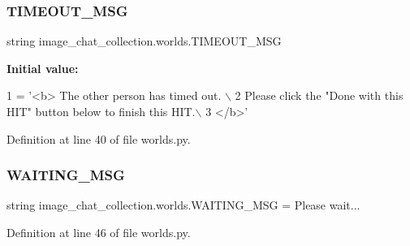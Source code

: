 \subsubsection{\texorpdfstring{T\+I\+M\+E\+O\+U\+T\+\_\+\+M\+SG}{TIMEOUT\_MSG}}
{\footnotesize\ttfamily string image\+\_\+chat\+\_\+collection.\+worlds.\+T\+I\+M\+E\+O\+U\+T\+\_\+\+M\+SG}

{\bfseries Initial value\+:}
\begin{DoxyCode}
1 =  \textcolor{stringliteral}{'<b> The other person has timed out. \(\backslash\)}
2 \textcolor{stringliteral}{        Please click the "Done with this HIT" button below to finish this HIT.\(\backslash\)}
3 \textcolor{stringliteral}{        </b>'}
\end{DoxyCode}


Definition at line 40 of file worlds.\+py.

\mbox{\label{namespaceimage__chat__collection_1_1worlds_a67cfa4b1bb447ae06398b6b8826ebbfd}} 
\subsubsection{\texorpdfstring{W\+A\+I\+T\+I\+N\+G\+\_\+\+M\+SG}{WAITING\_MSG}}
{\footnotesize\ttfamily string image\+\_\+chat\+\_\+collection.\+worlds.\+W\+A\+I\+T\+I\+N\+G\+\_\+\+M\+SG = \textquotesingle{}Please wait...\textquotesingle{}}



Definition at line 46 of file worlds.\+py.

